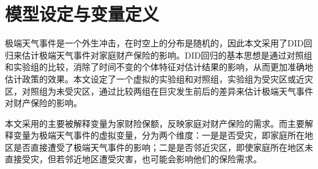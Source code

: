 \section{模型设定与变量定义}

极端天气事件是一个外生冲击，在时空上的分布是随机的，因此本文采用了DID回归来估计极端天气事件对家庭财产保险的影响。DID回归的基本思想是通过对照组和实验组的比较，消除了时间不变的个体特征对估计结果的影响，从而更加准确地估计政策的效果。本文设定了一个虚拟的实验组和对照组，实验组为受灾区或近灾区，对照组为未受灾区，通过比较两组在巨灾发生前后的差异来估计极端天气事件对财产保险的影响。

本文采用的主要被解释变量为家财险保额，反映家庭对财产保险的需求。而主要解释变量为极端天气事件的虚拟变量，分为两个维度：一是是否受灾，即家庭所在地区是否直接遭受了极端天气事件的影响；二是是否邻近灾区，即使家庭所在地区未直接受灾，但若邻近地区遭受灾害，也可能会影响他们的保险需求。


